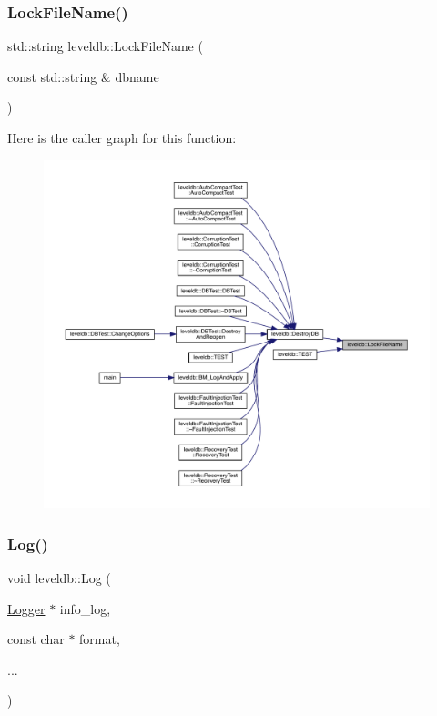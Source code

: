\subsubsection{\texorpdfstring{LockFileName()}{LockFileName()}}
{\footnotesize\ttfamily std\+::string leveldb\+::\+Lock\+File\+Name (\begin{DoxyParamCaption}\item[{const std\+::string \&}]{dbname }\end{DoxyParamCaption})}

Here is the caller graph for this function\+:
\nopagebreak
\begin{figure}[H]
\begin{center}
\leavevmode
\includegraphics[width=350pt]{namespaceleveldb_a9f772d88ab2d47dec0d68e5eb85c579e_icgraph}
\end{center}
\end{figure}
\mbox{\label{namespaceleveldb_aeba9623ceee38be99bed2bc1ae082954}} 
\subsubsection{\texorpdfstring{Log()}{Log()}}
{\footnotesize\ttfamily void leveldb\+::\+Log (\begin{DoxyParamCaption}\item[{\mbox{\hyperlink{classleveldb_1_1_logger}{Logger}} $\ast$}]{info\+\_\+log,  }\item[{const char $\ast$}]{format,  }\item[{}]{... }\end{DoxyParamCaption})}

